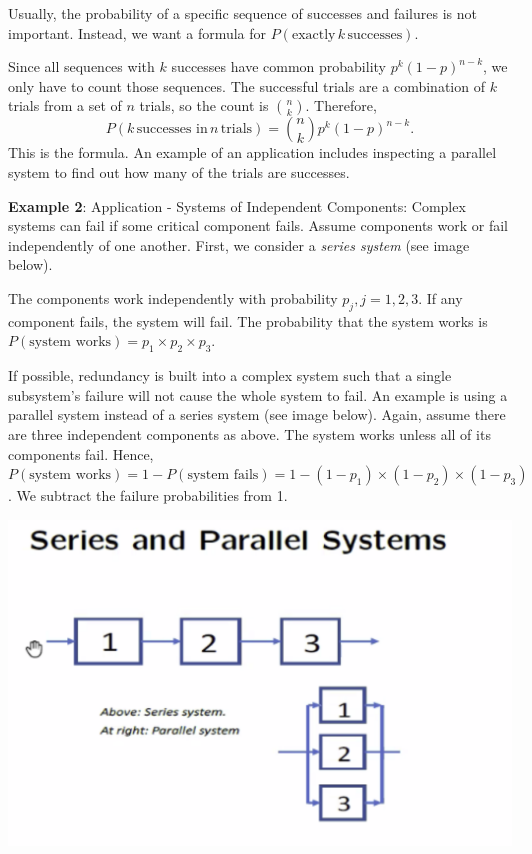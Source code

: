 Usually, the probability of a specific sequence of successes and failures is not important. Instead, we want a formula for $P(\text{exactly} \, k \, \text{successes})$.

Since all sequences with $k$ successes have common probability $p^k(1-p)^{n-k}$, we only have to count those sequences. The successful trials are a combination of $k$ trials from a set of $n$ trials, so the count is $n \choose k$. Therefore, $$P(k \, \text{successes in} \, n \, \text{trials}) = {n \choose k} p^k(1-p)^{n-k}.$$ This is the  formula. An example of an application includes inspecting a parallel system to find out how many of the trials are successes. 

\textbf{Example 2}: Application - Systems of Independent Components: Complex systems can fail if some critical component fails. Assume components work or fail independently of one another. First, we consider a \textit{series system} (see image below). 

The components work independently with probability $p_{j}, j=1, 2, 3$. If any component fails, the system will fail. The probability that the system works is $P(\text{system works}) = p_{1} \times p_{2} \times p_{3}$.

If possible, redundancy is built into a complex system such that a single subsystem's failure will not cause the whole system to fail. An example is using a parallel system instead of a series system (see image below). Again, assume there are three independent components as above. The system works unless all of its components fail. Hence, $P(\text{system works}) = 1-P(\text{system fails}) = 1-(1-p_{1}) \times (1-p_{2}) \times (1-p_{3})$. We subtract the failure probabilities from 1.

\vspace{0in}\includegraphics[scale=0.4]{media/wk2systems.png} \\